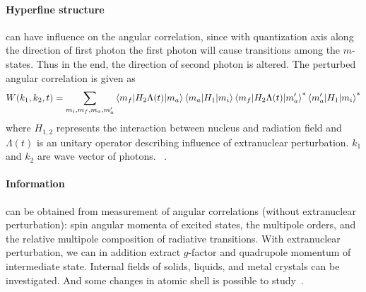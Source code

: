 \paragraph{Hyperfine structure} can have influence on the angular correlation, since with quantization axis along the direction of first photon the first photon will cause transitions among the $m$-states. Thus in the end, the direction of second photon is altered. The perturbed angular correlation is given as
\begin{equation}
   W(k_1, k_2, t) = \sum_{m_i, m_f, m_a, m'_a} \braket{m_f | H_2 \Lambda(t) | m_a} \braket{m_a | H_1 | m_i} \braket{m_f | H_2 \Lambda(t) | m'_a}^* \braket{m'_a | H_1 | m_i}^*
\end{equation}
where $H_{1,2}$ represents the interaction between nucleus and radiation field and $\Lambda(t)$ is an unitary operator describing influence of extranuclear perturbation. $k_1$ and $k_2$ are wave vector of photons.
~\cite{siegbahn}.


\paragraph{Information} can be obtained from measurement of \gag angular correlations (without extranuclear perturbation): spin angular momenta of excited states, the multipole orders, and the relative multipole composition of radiative transitions\cite{RAWilson}. With extranuclear perturbation, we can in addition extract $g$-factor and quadrupole momentum of intermediate state. Internal fields of solids, liquids, and metal crystals can be investigated. And some changes in atomic shell is possible to study~\cite{siegbahn}.
